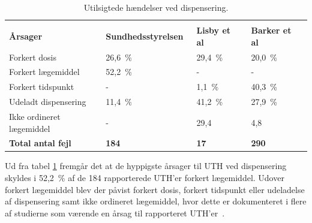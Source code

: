 \vspace{2mm}
\begin{longtable}{p{5cm}|p{4.2cm}|p{2cm}|p{2cm}}
	\caption{Utilsigtede hændelser ved dispensering.}
	\vspace{2mm}
	\label{table:UTHdispensering} \\
\cellcolor[HTML]{C0C0C0} {\textbf{Årsager}} & 
{\cellcolor[HTML]{C0C0C0}\textbf{Sundhedsstyrelsen~\citep{Sundhedsstyrelsen2005}}} &
{\cellcolor[HTML]{C0C0C0}\textbf{Lisby et al~\citep{Lisby2005}}} &
{\cellcolor[HTML]{C0C0C0}\textbf{Barker et al~\citep{Barker2002}}} \\ \hline
Forkert dosis & 26,6~\% & 29,4~\% &  20,0~\% \\ \hline
Forkert lægemiddel & 52,2~\% & - & - \\ \hline
Forkert tidspunkt & - & 1,1~\% & 40,3~\% \\ \hline
Udeladt dispensering & 11,4~\% & 41,2~\% & 27,9~\% \\ \hline
Ikke ordineret lægemiddel & - & 29,4 & 4,8 \\ \hline
\cellcolor[HTML]{C0C0C0} {\textbf{Total antal fejl}} & 
{\cellcolor[HTML]{C0C0C0}\textbf{184}} &
{\cellcolor[HTML]{C0C0C0}\textbf{17}} &
{\cellcolor[HTML]{C0C0C0}\textbf{290}}
\end{longtable}

Ud fra tabel \ref{table:UTHdispensering} fremgår det at de hyppigste årsager til UTH ved dispensering skyldes i 52,2~\% af de 184 rapporterede UTH'er forkert lægemiddel. Udover forkert lægemiddel blev der påvist forkert dosis, forkert tidspunkt eller udeladelse af dispensering samt ikke ordineret lægemiddel, hvor dette er dokumenteret i flere af studierne som værende en årsag til rapporteret UTH'er~\citep{Lisby2005, Sundhedsstyrelsen2005,Barker2002}.

